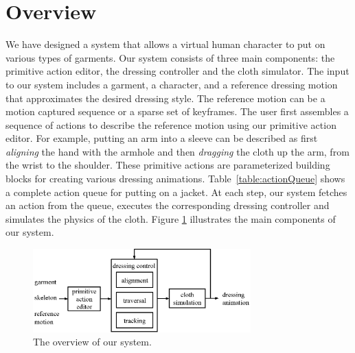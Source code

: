 \section{Overview}


We have designed a system that allows a virtual human character to put on
various types of garments. Our system consists of three main components:
the primitive action editor, the dressing controller and the cloth
simulator. The input to our system includes a garment, a character, and a
reference dressing motion that approximates the desired dressing style.
The reference motion can be a motion captured sequence or a sparse set of
keyframes. The user first assembles a sequence of actions to describe the
reference motion using our primitive action editor. For example, putting
an arm into a sleeve can be described as first \emph{aligning} the hand
with the armhole and then \emph{dragging} the cloth up the arm, from the
wrist to the shoulder. These primitive actions are parameterized
building blocks for creating various dressing animations.
Table~\ref{table:actionQueue} shows a complete action queue for putting on
a jacket. At each step, our system fetches an action from the
queue, executes the corresponding dressing controller and simulates the
physics of the cloth. Figure \ref{fig:overview} illustrates the main
components of our system. 

\begin{figure}
  \centering
  \includegraphics[width=3.3in]{images/overview}
  \caption{The overview of our system.}
  \label{fig:overview}
\end{figure}


